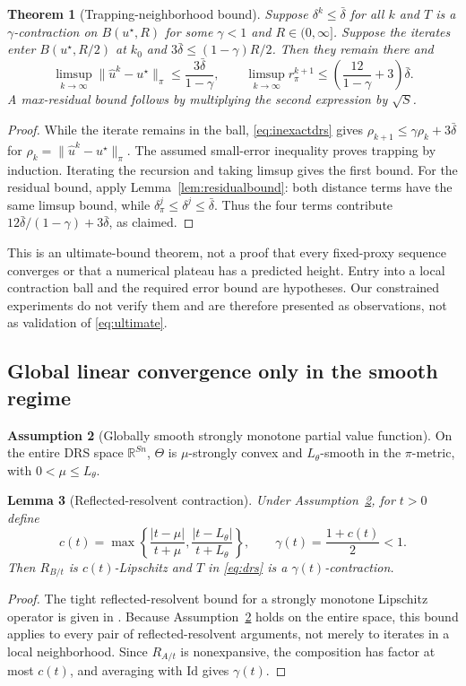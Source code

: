 \documentclass[preprint,12pt,3p]{elsarticle}
\newtheorem{theorem}{Theorem}[section]
\newtheorem{lemma}[theorem]{Lemma}
\theoremstyle{definition}
\newtheorem{assumption}[theorem]{Assumption}
\begin{document}
\begin{theorem}[Trapping-neighborhood bound]\label{thm:trapping}
Suppose $\delta^k\leq\bar\delta$ for all $k$ and $T$ is a $\gamma$-contraction on $B(u^\star,R)$ for some $\gamma<1$ and $R\in(0,\infty]$. Suppose the iterates enter $B(u^\star,R/2)$ at $k_0$ and $3\bar\delta\leq(1-\gamma)R/2$. Then they remain there and
\begin{equation}
\limsup_{k\to\infty}\|\widehat u^k-u^\star\|_\pi\leq\frac{3\bar\delta}{1-\gamma},\qquad
\limsup_{k\to\infty}r_\pi^{k+1}\leq\left(\frac{12}{1-\gamma}+3\right)\bar\delta.
\label{eq:ultimate}
\end{equation}
A max-residual bound follows by multiplying the second expression by $\sqrt S$.
\end{theorem}
\begin{proof}
While the iterate remains in the ball, \eqref{eq:inexactdrs} gives $\rho_{k+1}\leq\gamma\rho_k+3\bar\delta$ for $\rho_k=\|\widehat u^k-u^\star\|_\pi$. The assumed small-error inequality proves trapping by induction. Iterating the recursion and taking limsup gives the first bound. For the residual bound, apply Lemma~\ref{lem:residualbound}: both distance terms have the same limsup bound, while $\delta_\pi^j\leq\delta^j\leq\bar\delta$. Thus the four terms contribute $12\bar\delta/(1-\gamma)+3\bar\delta$, as claimed.
\end{proof}
This is an ultimate-bound theorem, not a proof that every fixed-proxy sequence converges or that a numerical plateau has a predicted height. Entry into a local contraction ball and the required error bound are hypotheses. Our constrained experiments do not verify them and are therefore presented as observations, not as validation of \eqref{eq:ultimate}.

\subsection{Global linear convergence only in the smooth regime}
\begin{assumption}[Globally smooth strongly monotone partial value function]\label{ass:smooth}
On the entire DRS space $\mathbb R^{Sn}$, $\Theta$ is $\mu$-strongly convex and $L_\theta$-smooth in the $\pi$-metric, with $0<\mu\leq L_\theta$.
\end{assumption}
\begin{lemma}[Reflected-resolvent contraction]\label{lem:reflected}
Under Assumption~\ref{ass:smooth}, for $t>0$ define
\[
c(t)=\max\left\{\frac{|t-\mu|}{t+\mu},\frac{|t-L_\theta|}{t+L_\theta}\right\},\qquad
\gamma(t)=\frac{1+c(t)}2<1.
\]
Then $R_{B/t}$ is $c(t)$-Lipschitz and $T$ in \eqref{eq:drs} is a $\gamma(t)$-contraction.
\end{lemma}
\begin{proof}
The tight reflected-resolvent bound for a strongly monotone Lipschitz operator is given in \cite{giselsson2017linear}. Because Assumption~\ref{ass:smooth} holds on the entire space, this bound applies to every pair of reflected-resolvent arguments, not merely to iterates in a local neighborhood. Since $R_{A/t}$ is nonexpansive, the composition has factor at most $c(t)$, and averaging with $\mathrm{Id}$ gives $\gamma(t)$.
\end{proof}
\end{document}
